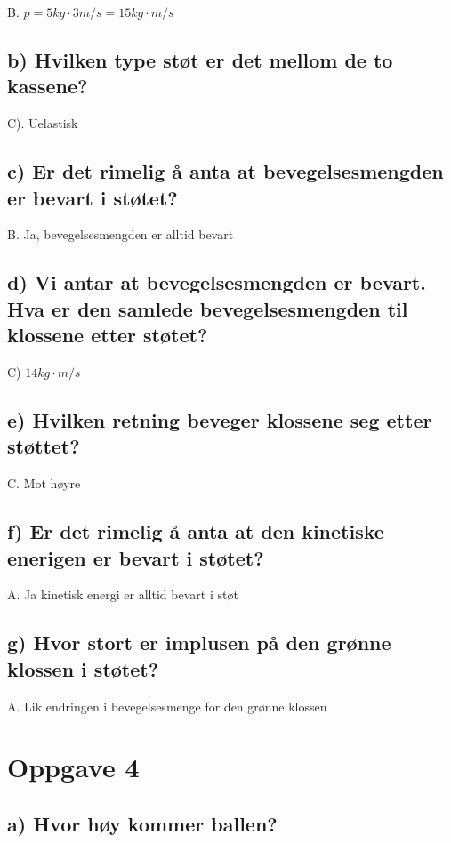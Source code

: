 \documentclass{article}
\begin{document}
B. $p = 5kg \cdot 3 m/s = 15 kg \cdot m/s$

\subsection{b) Hvilken type støt er det mellom de to kassene?}

C). Uelastisk

\subsection{c) Er det rimelig å anta at bevegelsesmengden er bevart i støtet?}

B. Ja, bevegelsesmengden er alltid bevart

\subsection{d) Vi antar at bevegelsesmengden er bevart. Hva er den samlede bevegelsesmengden til klossene etter støtet?}

C) $14 kg \cdot m/s$

\subsection{e) Hvilken retning beveger klossene seg etter støttet?}

C. Mot høyre

\subsection{f) Er det rimelig å anta at den kinetiske enerigen er bevart i støtet?}

A. Ja kinetisk energi er alltid bevart i støt

\subsection{g) Hvor stort er implusen på den grønne klossen i støtet?}

A. Lik endringen i bevegelsesmenge for den grønne klossen

\section{Oppgave 4}

\subsection{a) Hvor høy kommer ballen?}
\end{document}
